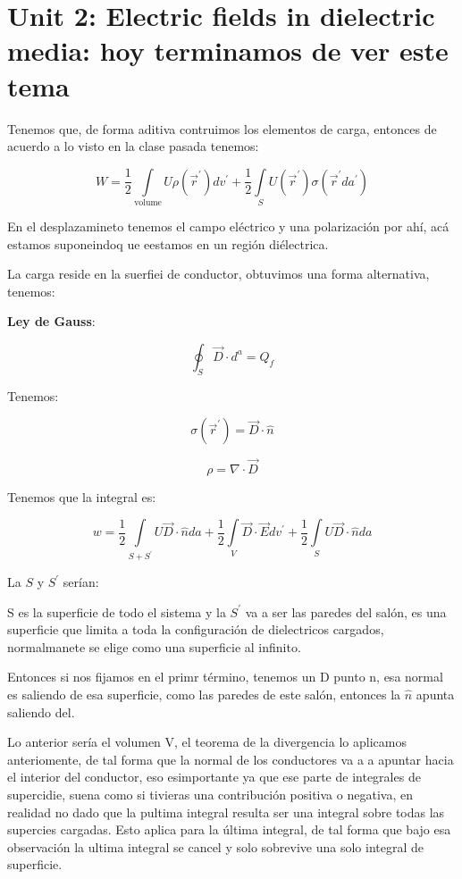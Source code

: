 \documentclass{article}
\begin{document}
\section{Unit 2: Electric fields in dielectric media: hoy terminamos de ver este tema}






Tenemos que, de forma aditiva contruimos los elementos de carga, entonces de acuerdo a lo visto en la clase pasada tenemos:


\[ W=\frac{1}{2} \int\limits_{\text{volume}} U\rho(\vec{r}^{ \prime}) dv^{\prime} + \frac{1}{2} \int\limits_{S} U(\vec{r}^{\prime}) \sigma(\vec{r}^{\prime}da^{\prime}) \]

En el desplazamineto tenemos el campo eléctrico y una polarización por ahí, acá estamos suponeindoq ue eestamos en un región diélectrica.


La carga reside en la suerfiei de conductor, obtuvimos una forma alternativa, tenemos:


\textbf{Ley de Gauss}:


\[  \oint_{S} \vec{D} \cdot d^{a} =Q_{f}  \]


Tenemos:


\[ \sigma(\vec{r}^{\prime}) =\vec{D}\cdot \hat{n} \]

\[  \rho = \nabla \cdot \vec{D} \]



Tenemos que la integral es:


\[  w= \frac{1}{2}\int\limits_{S+S^{\prime}} U\vec{D} \cdot \hat{n}da + \frac{1}{2} \int\limits_{V} \vec{D} \cdot \vec{E}dv^{\prime} + \frac{1}{2} \int\limits_{S} U\vec{D}\cdot \hat{n} da \]


La $S$ y $S^{\prime}$ serían:

S es la superficie de todo el sistema y la $S^{\prime}$ va a ser las paredes del salón, es una superficie que limita a toda la configuración de dielectricos cargados, normalmanete se elige como una superficie al infinito.

Entonces si nos fijamos en el primr término, tenemos un D punto n, esa normal es saliendo de esa superficie, como las paredes de este salón, entonces la $\hat{n}$ apunta saliendo del.




Lo anterior sería el volumen V, el teorema de la divergencia lo aplicamos anteriomente, de tal forma que la normal de los conductores va a a apuntar hacia el interior del conductor, eso esimportante ya que ese parte de integrales de supercidie, suena como si tivieras una contribución positiva o negativa, en realidad no dado que la pultima integral resulta ser una integral sobre todas las supercies cargadas. Esto aplica para la última integral, de tal forma que bajo esa observación la ultima integral se cancel y solo sobrevive una solo integral de superficie. 
\end{document}
